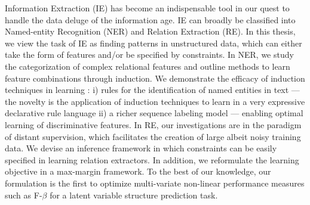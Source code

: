 Information Extraction (IE) has become an indispensable tool in our quest to handle the data deluge of the information age. IE can broadly be classified into Named-entity Recognition (NER) and Relation Extraction (RE). In this thesis, we view the task of IE as finding patterns in unstructured data, which can either take the form of features and/or be specified by constraints. In NER, we study the categorization of complex relational features and outline methods to learn feature combinations through induction. We demonstrate the efficacy of induction techniques in learning : i) rules for the identification of named entities in text --- the novelty is the application of induction techniques to learn in a very expressive declarative rule language ii) a richer sequence labeling model --- enabling optimal learning of discriminative features. In RE, our investigations are in the paradigm of distant supervision, which facilitates the creation of large albeit noisy training data. We devise an inference framework in which constraints can be easily specified in learning relation extractors. In addition, we reformulate the learning objective in a max-margin framework. To the best of our knowledge, our formulation is the first to optimize multi-variate non-linear performance measures such as F-$\beta$ for a latent variable structure prediction task.
